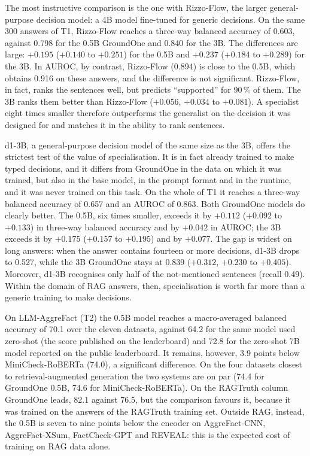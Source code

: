 The most instructive comparison is the one with Rizzo-Flow, the larger general-purpose decision model: a 4B model
fine-tuned for generic decisions. On the same 300 answers of T1, Rizzo-Flow reaches a three-way balanced accuracy of
0.603, against 0.798 for the 0.5B GroundOne and 0.840 for the 3B. The differences are large: $+0.195$ ($+0.140$ to
$+0.251$) for the 0.5B and $+0.237$ ($+0.184$ to $+0.289$) for the 3B. In AUROC, by contrast, Rizzo-Flow (0.894) is
close to the 0.5B, which obtains 0.916 on these answers, and the difference is not significant. Rizzo-Flow, in fact,
ranks the sentences well, but predicts ``supported'' for 90\,\% of them. The 3B ranks them better than Rizzo-Flow
($+0.056$, $+0.034$ to $+0.081$). A specialist eight times smaller therefore outperforms the generalist on the decision
it was designed for and matches it in the ability to rank sentences.

d1-3B, a general-purpose decision model of the same size as the 3B, offers the strictest test of the value of
specialisation. It is in fact already trained to make typed decisions, and it differs from GroundOne in the data on which it was trained, but also in the base model, in the prompt format and in the runtime, and it was never trained on this task. On the whole of T1 it reaches a three-way balanced accuracy of 0.657 and an AUROC of 0.863.
Both GroundOne models do clearly better. The 0.5B, six times smaller, exceeds it by $+0.112$ ($+0.092$ to $+0.133$) in
three-way balanced accuracy and by $+0.042$ in AUROC; the 3B exceeds it by $+0.175$ ($+0.157$ to $+0.195$) and by
$+0.077$. The gap is widest on long answers: when the answer contains fourteen or more decisions, d1-3B drops to 0.527,
while the 3B GroundOne stays at 0.839 ($+0.312$, $+0.230$ to $+0.405$). Moreover, d1-3B recognises only half of the
not-mentioned sentences (recall 0.49). Within the domain of RAG answers, then, specialisation is worth far more than a
generic training to make decisions.

On LLM-AggreFact (T2) the 0.5B model reaches a macro-averaged balanced accuracy of 70.1 over the eleven datasets,
against 64.2 for the same model used zero-shot (the score published on the leaderboard) and 72.8 for the zero-shot 7B
model reported on the public leaderboard. It remains, however, 3.9 points below MiniCheck-RoBERTa (74.0), a significant
difference. On the four datasets closest to retrieval-augmented generation the two systems are on par (74.4 for
GroundOne 0.5B, 74.6 for MiniCheck-RoBERTa). On the RAGTruth column GroundOne leads, 82.1 against 76.5, but the
comparison favours it, because it was trained on the answers of the RAGTruth training set. Outside RAG, instead, the
0.5B is seven to nine points below the encoder on AggreFact-CNN, AggreFact-XSum, FactCheck-GPT and REVEAL: this is the
expected cost of training on RAG data alone.

